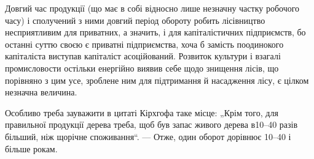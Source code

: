 Довгий час продукції (що має в собі відносно лише незначну частку робочого часу) і сполучений з ними
довгий період обороту робить лісівництво несприятливим для приватних, а значить, і для
капіталістичних підприємств, бо останні суттю своєю є приватні підприємства, хоча б замість
поодинокого капіталіста виступав капіталіст асоційований. Розвиток культури і взагалі промисловости
остільки енергійно виявив себе щодо знищення лісів, що порівняно з цим усе, зроблене ним для
підтримання й насадження лісу, є цілком незначна величина.

Особливо треба зауважити в цитаті Кірхгофа таке місце: „Крім того, для правильної продукції дерева
треба, щоб був запас живого дерева в10–40 разів більший, ніж щорічне споживання“. — Отже, один
оборот дорівнює 10–40 і більше рокам.
